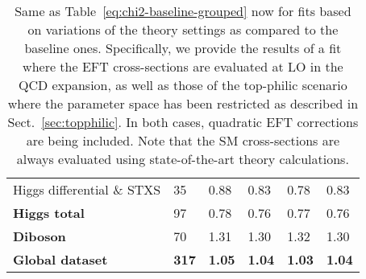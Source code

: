 \begin{table}[t]
\begin{tabular}{l|C{1.0cm}|C{1.2cm}|C{2.0cm}|C{2.7cm}|C{2.2cm}}
Higgs differential \& STXS  &  35    & 0.88  &  0.83       &  0.78     &  0.83       \\
{\bf Higgs  total}          &   97   & 0.78  &  0.76       &  0.77     &  0.76     \\
\midrule
{\bf Diboson}               &  70    & 1.31  &  1.30       &   1.32    &   1.30      \\
\midrule
{\bf Global dataset}        & {\bf 317}   & {\bf 1.05}  &  {\bf 1.04}   &   {\bf 1.03}     &   {\bf 1.04}      \\
\bottomrule
\end{tabular}
  \caption{\small Same as Table~\ref{eq:chi2-baseline-grouped} now for fits based on
    variations of the theory settings as compared to the baseline ones.
    Specifically, we provide the results of a fit where the EFT cross-sections are evaluated at LO in the QCD
    expansion, as well as those of the top-philic scenario where the  parameter space
    has been restricted as described in Sect.~\ref{sec:topphilic}.
    In both cases, quadratic EFT corrections are being included.
    Note that the SM cross-sections are always evaluated using state-of-the-art theory
    calculations.
\label{eq:chi2-theoryvariations}
}
\end{table}

